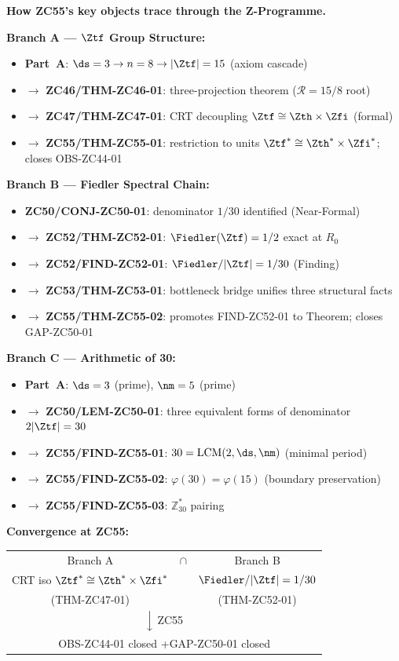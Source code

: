 \documentclass[12pt, a4paper]{article}
\begin{document}
\begin{genealogybox}
\textbf{How ZC55's key objects trace through the Z-Programme.}

\medskip
\textbf{Branch A --- $\Ztf$ Group Structure:}
\begin{itemize}[leftmargin=2em, noitemsep]
\item \textbf{Part~A}: $\ds=3\to n=8\to|\Ztf|=15$
  (axiom cascade)
\item $\to$ \textbf{ZC46/THM-ZC46-01}: three-projection theorem
  ($\mathcal{R}=15/8$ root)
\item $\to$ \textbf{ZC47/THM-ZC47-01}: CRT decoupling
  $\Ztf\cong\Zth\times\Zfi$ (formal)
\item $\to$ \textbf{ZC55/THM-ZC55-01}: restriction to units
  $\Ztf^*\cong\Zth^*\times\Zfi^*$; closes OBS-ZC44-01
\end{itemize}

\medskip
\textbf{Branch B --- Fiedler Spectral Chain:}
\begin{itemize}[leftmargin=2em, noitemsep]
\item \textbf{ZC50/CONJ-ZC50-01}: denominator $1/30$
  identified (Near-Formal)
\item $\to$ \textbf{ZC52/THM-ZC52-01}: $\Fiedler(\Ztf)=1/2$
  exact at $R_0$
\item $\to$ \textbf{ZC52/FIND-ZC52-01}: $\Fiedler/|\Ztf|=1/30$
  (Finding)
\item $\to$ \textbf{ZC53/THM-ZC53-01}: bottleneck bridge
  unifies three structural facts
\item $\to$ \textbf{ZC55/THM-ZC55-02}: promotes FIND-ZC52-01
  to Theorem; closes GAP-ZC50-01
\end{itemize}

\medskip
\textbf{Branch C --- Arithmetic of 30:}
\begin{itemize}[leftmargin=2em, noitemsep]
\item \textbf{Part~A}: $\ds=3$ (prime), $\nm=5$ (prime)
\item $\to$ \textbf{ZC50/LEM-ZC50-01}: three equivalent forms
  of denominator $2|\Ztf|=30$
\item $\to$ \textbf{ZC55/FIND-ZC55-01}: $30=\mathrm{LCM}(2,\ds,\nm)$
  (minimal period)
\item $\to$ \textbf{ZC55/FIND-ZC55-02}: $\varphi(30)=\varphi(15)$
  (boundary preservation)
\item $\to$ \textbf{ZC55/FIND-ZC55-03}: $\mathbb{Z}_{30}^*$ pairing
\end{itemize}

\medskip
\textbf{Convergence at ZC55:}
\begin{center}
\begin{tabular}{@{}ccc@{}}
Branch A & $\cap$ & Branch B \\
CRT iso $\Ztf^*\cong\Zth^*\times\Zfi^*$ & & $\Fiedler/|\Ztf|=1/30$ \\
(THM-ZC47-01) & & (THM-ZC52-01) \\
\multicolumn{3}{c}{$\Big\downarrow$ ZC55} \\
\multicolumn{3}{c}{OBS-ZC44-01 closed \quad+\quad GAP-ZC50-01 closed} \\
\end{tabular}
\end{center}


\end{genealogybox}
\end{document}
